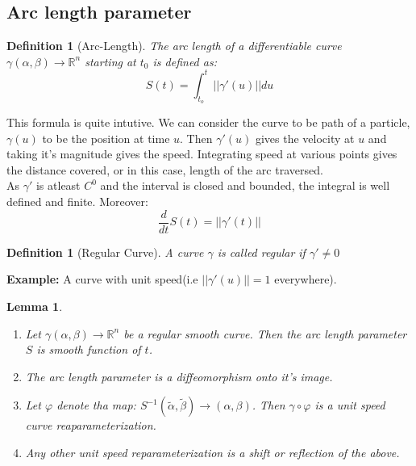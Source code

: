 \documentclass[oneside]{book}\twocolumn
\newtheorem{definition}[theorem]{Definition}
\newtheorem{lemma}[theorem]{Lemma}
\begin{document}
\subsection{Arc length parameter}
\begin{definition}[Arc-Length]
The arc length of a differentiable curve $\gamma(\alpha,\beta)\to\mathbb R^n$ starting at $t_0$ is defined as:
$$S(t)=\int_{t_o}^t||\gamma'(u)||du$$
\end{definition}
This formula is quite intutive. We can consider the curve to be path of a particle, $\gamma(u)$ to be the position at time $u$. Then $\gamma'(u)$ gives the velocity at $u$ and taking it's magnitude gives the speed. Integrating speed at various points gives the distance covered, or in this case, length of the arc traversed.\\
As $\gamma'$ is atleast $C^0$ and the interval is closed and bounded, the integral is well defined and finite. Moreover:
$$\frac{d}{dt}S(t)=||\gamma'(t)||$$
\begin{definition}[Regular Curve]
A curve $\gamma$ is called regular if $\gamma'\ne0$
\end{definition}
\textbf{Example: }A curve with unit speed(i.e $||\gamma'(u)||=1$ everywhere).
\begin{lemma}
\begin{enumerate}
    \item Let $\gamma(\alpha,\beta)\to\mathbb R^n$ be a regular smooth curve. Then the arc length parameter $S$ is smooth function of $t$.
    \item The arc length parameter is a diffeomorphism onto it's image.
    \item Let $\varphi$ denote tha map: $S^{-1}(\tilde\alpha,\tilde\beta)\to(\alpha,\beta)$. Then $\gamma\circ\varphi$ is a unit speed curve reaparameterization.
    \item Any other unit speed reparameterization is a shift or reflection of the above.
\end{enumerate}
\end{lemma}
\end{document}
